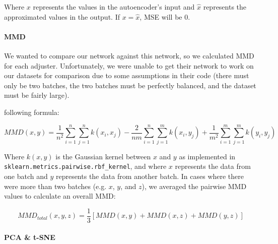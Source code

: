 \documentclass{article}
\begin{document}
Where $x$ represents the values in the autoencoder's input and $\hat{x}$ represents the approximated values in the output.
If $x = \hat{x}$, MSE will be 0.

\paragraph{MMD}

We wanted to compare our network against this network, so we calculated MMD for each adjuster.
Unfortunately, we were unable to get their network to work on our datasets for comparison due to some assumptions in their code (there must only be two batches, the two batches must be perfectly balanced, and the dataset must be fairly large).

following formula:

\begin{equation}
	\label{mmd}
	MMD(x, y) = \frac{1}{n^2}\sum_{i=1}^n{\sum_{j=1}^n{k(x_i, x_j)}} - \frac{2}{nm}\sum_{i=1}^n{\sum_{j=1}^m{k(x_i, y_j)}} + \frac{1}{m^2}\sum_{i=1}^m{\sum_{j=1}^m{k(y_i, y_j)}}
\end{equation}

Where $k(x, y)$ is the Gaussian kernel between $x$ and $y$ as implemented in \texttt{sklearn.metrics.pairwise.rbf\_kernel}, and where $x$ represents the data from one batch and $y$ represents the data from another batch.
In cases where there were more than two batches (e.g. $x$, $y$, and $z$), we averaged the pairwise MMD values to calculate an overall MMD:

\begin{equation}
	\label{mmd-mean}
	MMD_{total}(x, y, z) = \frac{1}{3}[MMD(x, y) + MMD(x, z) + MMD(y, z)]
\end{equation}

\paragraph{PCA \& t-SNE}
\end{document}
